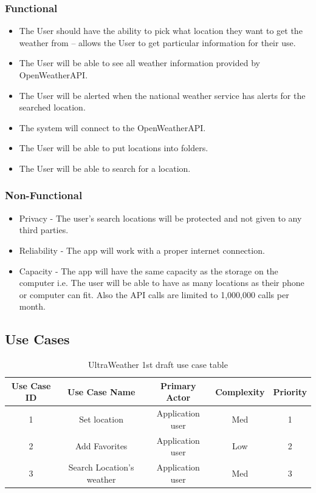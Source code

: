 \documentclass[10pt,conference,onecolumn,compsoc]{IEEEtran}
\begin{document}
\subsubsection{Functional}
\begin{itemize}
\item The User should have the ability to pick what location they want to get the weather from -- allows the User to get particular information for their use.
\item The User will be able to see all weather information provided by OpenWeatherAPI.
\item The User will be alerted when the national weather service has alerts for the searched location.
\item The system will connect to the OpenWeatherAPI.
\item The User will be able to put locations into folders.
\item The User will be able to search for a location.
\end{itemize}

\subsubsection{Non-Functional}
\begin{itemize}
\item Privacy - The user's search locations will be protected and not given to any third parties.
\item Reliability - The app will work with a proper internet connection.
\item Capacity - The app will have the same capacity as the storage on the computer i.e. The user will be able to have as many locations as their phone or computer can fit. Also the API calls are limited to 1,000,000 calls per month.
\end{itemize}

\subsection{Use Cases}


\begin{table}
\centering
\begin{tabular}{|c|c|c|c|c|}
\hline
Use Case ID & Use Case Name & Primary Actor & Complexity & Priority \\
\hline \hline
1 & Set location & Application user & Med & 1\\
\hline
2 & Add Favorites & Application user & Low & 2\\
\hline
3 & Search Location's weather & Application user & Med & 3\\
\hline

\end{tabular}
\caption{UltraWeather 1st draft use case table}
\label{tab:useCaseIndex}
\end{table}
\end{document}
